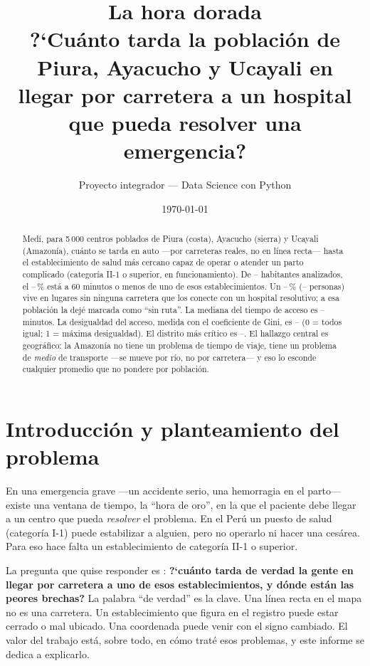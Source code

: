 \documentclass[12pt,a4paper]{article}
\title{\textbf{La hora dorada}\\[2mm]
\large ?`Cu\'anto tarda la poblaci\'on de Piura, Ayacucho y Ucayali en llegar
por carretera a un hospital que pueda resolver una emergencia?}
\author{Proyecto integrador --- Data Science con Python}
\date{\today}
\providecommand{\umbralOro}{60}
\providecommand{\nCentrosPoblados}{5\,000}
\providecommand{\poblacionTotal}{--}
\providecommand{\pctCubierta}{--}
\providecommand{\pctSinRuta}{--}
\providecommand{\poblacionSinRuta}{--}
\providecommand{\medianaAcceso}{--}
\providecommand{\giniTotal}{--}
\providecommand{\peorDistrito}{--}
\begin{document}
\maketitle

\begin{abstract}
\noindent
Med\'i, para \nCentrosPoblados{} centros poblados de Piura (costa), Ayacucho
(sierra) y Ucayali (Amazon\'ia), cu\'anto se tarda en auto ---por carreteras
reales, no en l\'inea recta--- hasta el establecimiento de salud m\'as
cercano capaz de operar o atender un parto complicado (categor\'ia
\mbox{II-1} o superior, en funcionamiento). De \poblacionTotal{} habitantes
analizados, el \pctCubierta\,\% est\'a a \umbralOro{} minutos o menos de uno
de esos establecimientos. Un \pctSinRuta\,\% (\poblacionSinRuta{} personas)
vive en lugares sin ninguna carretera que los conecte con un hospital
resolutivo; a esa poblaci\'on la dej\'e marcada como ``sin ruta''. La mediana del tiempo de acceso es
\medianaAcceso{} minutos. La desigualdad del acceso, medida con el
coeficiente de Gini, es \giniTotal{} (0 = todos igual; 1 = m\'axima
desigualdad). El distrito m\'as cr\'itico es \peorDistrito. El hallazgo
central es geogr\'afico: la Amazon\'ia no tiene un problema de tiempo de
viaje, tiene un problema de \emph{medio} de transporte ---se mueve por r\'io,
no por carretera--- y eso lo esconde cualquier promedio que no pondere por
poblaci\'on.
\end{abstract}

\section{Introducci\'on y planteamiento del problema}

En una emergencia grave ---un accidente serio, una hemorragia en el parto---
existe una ventana de tiempo, la ``hora de oro'', en la que el paciente debe
llegar a un centro que pueda \emph{resolver} el problema. En el Per\'u un
puesto de salud (categor\'ia \mbox{I-1}) puede estabilizar a alguien, pero
no operarlo ni hacer una ces\'area. Para eso hace falta un establecimiento de
categor\'ia \mbox{II-1} o superior.

La pregunta que quise responder es : \textbf{?`cu\'anto tarda de verdad la gente en llegar por
carretera a uno de esos establecimientos, y d\'onde est\'an las peores
brechas?} La palabra ``de verdad'' es la clave. Una l\'inea recta en el mapa
no es una carretera. Un establecimiento que figura en el registro puede
estar cerrado o mal ubicado. Una coordenada puede venir con el signo
cambiado. El valor del trabajo est\'a, sobre todo, en c\'omo trat\'e esos
problemas, y este informe se dedica a explicarlo.
\end{document}
